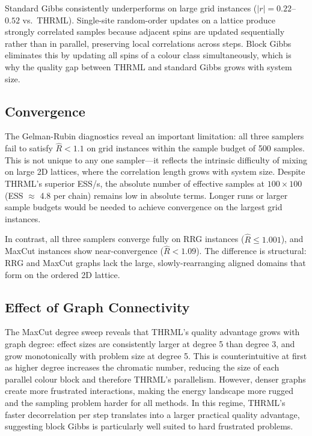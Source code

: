 \documentclass[conference]{IEEEtran}
\begin{document}
Standard Gibbs consistently underperforms on large grid instances ($|r| = 0.22$--$0.52$ vs.\ THRML). Single-site random-order updates on a lattice produce strongly correlated samples because adjacent spins are updated sequentially rather than in parallel, preserving local correlations across steps. Block Gibbs eliminates this by updating all spins of a colour class simultaneously, which is why the quality gap between THRML and standard Gibbs grows with system size.

\subsection{Convergence}

The Gelman-Rubin diagnostics reveal an important limitation: all three samplers fail to satisfy $\hat{R} < 1.1$ on grid instances within the sample budget of 500 samples. This is not unique to any one sampler---it reflects the intrinsic difficulty of mixing on large 2D lattices, where the correlation length grows with system size. Despite THRML's superior ESS/s, the absolute number of effective samples at $100{\times}100$ (ESS $\approx$ 4.8 per chain) remains low in absolute terms. Longer runs or larger sample budgets would be needed to achieve convergence on the largest grid instances.

In contrast, all three samplers converge fully on RRG instances ($\hat{R} \leq 1.001$), and MaxCut instances show near-convergence ($\hat{R} < 1.09$). The difference is structural: RRG and MaxCut graphs lack the large, slowly-rearranging aligned domains that form on the ordered 2D lattice.

\subsection{Effect of Graph Connectivity}

The MaxCut degree sweep reveals that THRML's quality advantage grows with graph degree: effect sizes are consistently larger at degree 5 than degree 3, and grow monotonically with problem size at degree 5. This is counterintuitive at first as higher degree increases the chromatic number, reducing the size of each parallel colour block and therefore THRML's parallelism. However, denser graphs create more frustrated interactions, making the energy landscape more rugged and the sampling problem harder for all methods. In this regime, THRML's faster decorrelation per step translates into a larger practical quality advantage, suggesting block Gibbs is particularly well suited to hard frustrated problems.
\end{document}
